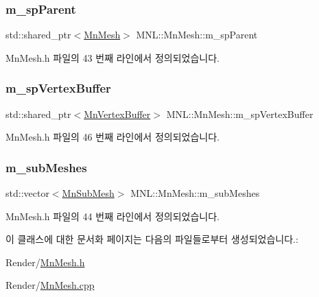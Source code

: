\subsubsection{\texorpdfstring{m\+\_\+sp\+Parent}{m\_spParent}}
{\footnotesize\ttfamily std\+::shared\+\_\+ptr$<$\hyperlink{class_m_n_l_1_1_mn_mesh}{Mn\+Mesh}$>$ M\+N\+L\+::\+Mn\+Mesh\+::m\+\_\+sp\+Parent\hspace{0.3cm}{\ttfamily [protected]}}



Mn\+Mesh.\+h 파일의 43 번째 라인에서 정의되었습니다.

\mbox{\label{class_m_n_l_1_1_mn_mesh_aff6e55968332581a0848069303689fa4}} 
\subsubsection{\texorpdfstring{m\+\_\+sp\+Vertex\+Buffer}{m\_spVertexBuffer}}
{\footnotesize\ttfamily std\+::shared\+\_\+ptr$<$\hyperlink{class_m_n_l_1_1_mn_vertex_buffer}{Mn\+Vertex\+Buffer}$>$ M\+N\+L\+::\+Mn\+Mesh\+::m\+\_\+sp\+Vertex\+Buffer\hspace{0.3cm}{\ttfamily [protected]}}



Mn\+Mesh.\+h 파일의 46 번째 라인에서 정의되었습니다.

\mbox{\label{class_m_n_l_1_1_mn_mesh_a1319f6800c28153c09fba2eb1843a41d}} 
\subsubsection{\texorpdfstring{m\+\_\+sub\+Meshes}{m\_subMeshes}}
{\footnotesize\ttfamily std\+::vector$<$\hyperlink{struct_m_n_l_1_1_mn_sub_mesh}{Mn\+Sub\+Mesh}$>$ M\+N\+L\+::\+Mn\+Mesh\+::m\+\_\+sub\+Meshes\hspace{0.3cm}{\ttfamily [protected]}}



Mn\+Mesh.\+h 파일의 44 번째 라인에서 정의되었습니다.



이 클래스에 대한 문서화 페이지는 다음의 파일들로부터 생성되었습니다.\+:\begin{DoxyCompactItemize}
\item 
Render/\hyperlink{_mn_mesh_8h}{Mn\+Mesh.\+h}\item 
Render/\hyperlink{_mn_mesh_8cpp}{Mn\+Mesh.\+cpp}\end{DoxyCompactItemize}
